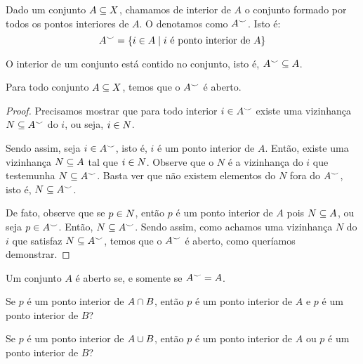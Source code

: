 \begin{definition}
	\label{def:interior}
	Dado um conjunto $A \subseteq X$, chamamos de interior de $A$ o conjunto formado por todos os pontos interiores de $A$. O denotamos como $A^{\smile}$. Isto é:
	\[
		A^{\smile} = \left\{ i \in A \mid \text{$i$ é ponto interior de $A$} \right\}
	\]
\end{definition}

\begin{fact}
	\label{fact:interior-contido}
	O interior de um conjunto está contido no conjunto, isto é, $A^{\smile} \subseteq A$.
\end{fact}

\begin{theorem}
	\label{thm:interior-aberto}
	Para todo conjunto $A \subseteq X$, temos que o $A^{\smile}$ é aberto.
\end{theorem}

\begin{proof}
	Precisamos mostrar que para todo interior $i \in A^{\smile}$ existe uma vizinhança $N \subseteq A^{\smile}$ do $i$, ou seja, $i \in N$. 
	
	Sendo assim, seja $i \in A^{\smile}$, isto é, $i$ é um ponto interior de $A$. Então, existe uma vizinhança $N \subseteq A$ tal que $i \in N$. Observe que o $N$ é a vizinhança do $i$ que testemunha $N \subseteq A^{\smile}$. Basta ver que não existem elementos do $N$ fora do $A^{\smile}$, isto é, $N \subseteq A^{\smile}$.
	
	De fato, observe que se $p \in N$, então $p$ é um ponto interior de $A$ pois $N \subseteq A$, ou seja $p \in A^{\smile}$. Então, $N \subseteq A^{\smile}$. Sendo assim, como achamos uma vizinhança $N$ do $i$ que satisfaz $N \subseteq A^{\smile}$, temos que o $A^{\smile}$ é aberto, como queríamos demonstrar.
\end{proof}

\begin{corollary}
	Um conjunto $A$ é aberto se, e somente se $A^{\smile} = A$.
\end{corollary}

\begin{question}
	Se $p$ é um ponto interior de $A \cap B$, então $p$ é um ponto interior de $A$ e $p$ é um ponto interior de $B$?
\end{question}

\begin{question}
	Se $p$ é um ponto interior de $A \cup B$, então $p$ é um ponto interior de $A$ ou $p$ é um ponto interior de $B$?
\end{question}

